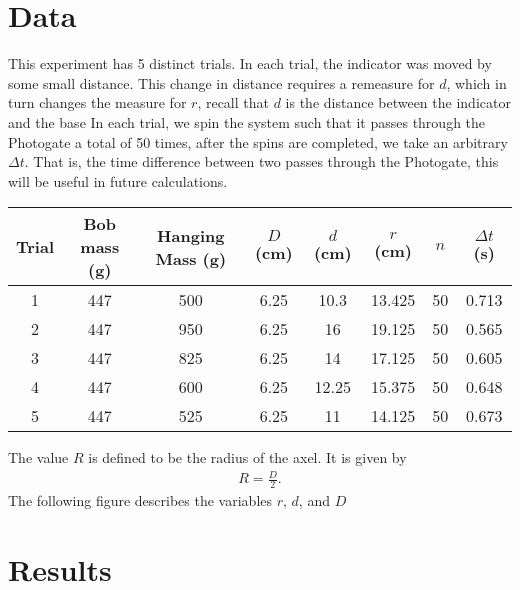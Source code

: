 \documentclass{report}
\begin{document}
    \pagebreak 
    \section{Data}
    \bigbreak \noindent 
    This experiment has 5 distinct trials. In each trial, the indicator was moved by some small distance. This change in distance requires a remeasure for $d$, which in turn changes the measure for $r$, recall that $d$ is the distance between the indicator and the base
    \bigbreak \noindent 
    In each trial, we spin the system such that it passes through the Photogate a total of 50 times, after the spins are completed, we take an arbitrary $\Delta t$. That is, the time difference between two passes through the Photogate, this will be useful in future calculations.
    \bigbreak \noindent 
    \begin{center}
        \begin{tabular}{c|c|c|c|c|c|c|c}
            Trial & Bob mass (g) & Hanging Mass (g) & $D$ (cm) & $d$ (cm) & $r$ (cm) & $n$ & $\Delta t$ (s) \\
            \midrule
            1 & 447 & 500 & 6.25 & 10.3 & 13.425 & 50 & 0.713 \\
            2 & 447 & 950 & 6.25 & 16 & 19.125 & 50 & 0.565 \\
            3 & 447 & 825 & 6.25 & 14 & 17.125 & 50 & 0.605 \\
            4 & 447 & 600 & 6.25 & 12.25 & 15.375 & 50 & 0.648 \\
            5 & 447 & 525 & 6.25 & 11 & 14.125 & 50 & 0.673 
        \end{tabular}
    \end{center}
    \bigbreak \noindent 
    The value $R$ is defined to be the radius of the axel. It is given by
    \begin{align*}
        R = \frac{D}{2}
    .\end{align*}
    The following figure describes the variables $r$, $d$, and $D$
    \bigbreak \noindent 
    \begin{figure}[ht]
        \centering
        \label{fig:fig3}
    \end{figure}

    \pagebreak 
    \section{Results}
    \bigbreak \noindent 
\end{document}
